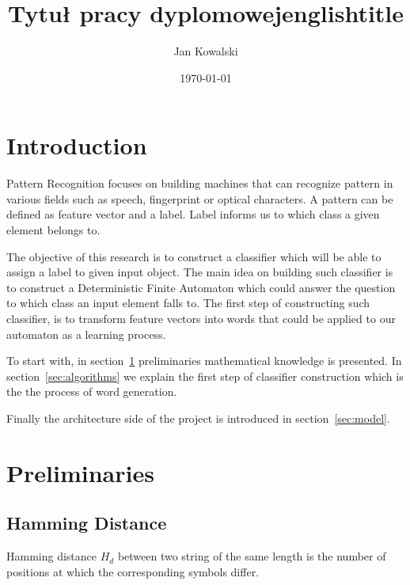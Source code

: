\documentclass{mini}
\title{Tytuł pracy dyplomowej}
\title{englishtitle}
\author{Jan Kowalski}
\date{\today}
\begin{document}
\maketitle
\tableofcontents

\chapter*{Introduction}

Pattern Recognition focuses on building machines that can recognize pattern in various fields such as speech, fingerprint or optical characters. A pattern can be defined as feature vector and a label. Label informs us to which class a given element belongs to.

The objective of this research is to construct a classifier which will be able to assign a label to given input object. The main idea on building such classifier is to construct a Deterministic Finite Automaton which could answer the question to which class an input element falls to. The first step of constructing such classifier, is to transform feature vectors into words that could be applied to our automaton as a learning process.

To start with, in section~\ref{sec:prelim} preliminaries mathematical knowledge is presented. In section~\ref{sec:algorithms} we explain the first step of classifier construction which is the the process of word generation.

Finally the architecture side of the project is introduced in section~\ref{sec:model}.

\chapter{Preliminaries}\label{sec:prelim}


\section{Hamming Distance} \label{sec:hamming}

Hamming distance $H_d$ between two string of the same length is the number of positions at which the corresponding symbols differ.
\end{document}
